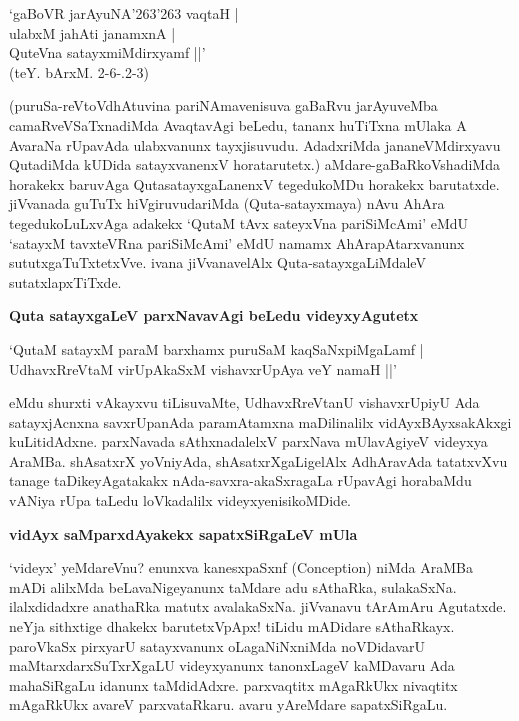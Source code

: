 \begin{shloka}
`gaBoVR jarAyuNA\char'263\char'263 vaqtaH |\\\label{87}
ulabxM ja{hA}ti janamxnA |\\
QuteVna satayxmiMdirxyamf ||'\\
(teY. bArxM. 2-6-.2-3)
\end{shloka}

(puruSa-reVtoVdhAtuvina pariNAmavenisuva gaBaRvu jarAyuveMba camaRveVSaTxnadiMda AvaqtavAgi beLedu, tananx huTiTxna mUlaka A AvaraNa rUpavAda ulabxvanunx tayxjisuvudu. AdadxriMda jananeVMdirxyavu QutadiMda kUDida satayxvanenxV horatarutetx.) aMdare-gaBaRkoVshadiMda horakekx baruvAga QutasatayxgaLanenxV tegedukoMDu horakekx barutatxde. jiVvanada guTuTx hiVgiruvudariMda (Quta-satayxmaya) nAvu AhAra tegedukoLuLxvAga adakekx `QutaM tAvx sateyxVna pariSiMcAmi' eMdU `satayxM tavxteVRna pariSiMcAmi'\label{87} eMdU namamx AhArapAtarxvanunx sututxgaTuTxtetxVve. ivana jiVvanavelAlx Quta-satayxgaLiMdaleV sutatxlapxTiTxde.

\noindent
\textbf{Quta satayxgaLeV parxNavavAgi beLedu videyxyAgutetx}\label{page87}

\begin{shloka}
`QutaM satayxM paraM barxhamx puruSaM kaqSaNxpiMgaLamf |\\\label{87}
UdhavxRreVtaM virUpAkaSxM vishavxrUpAya veY namaH ||'
\end{shloka}

eMdu shurxti vAkayxvu tiLisuvaMte, UdhavxRreVtanU vishavxrUpiyU Ada satayxjAcnxna savxrUpanAda paramAtamxna maDilinalilx vidAyxBAyxsakAkxgi kuLitidAdxne. parxNavada sAthxnadalelxV parxNava mUlavAgiyeV videyxya AraMBa. shAsatxrX yoVniyAda, shAsatxrXgaLigelAlx AdhAravAda tatatxvXvu tanage taDikeyAgatakakx nAda-savxra-akaSxragaLa rUpavAgi horabaMdu vANiya rUpa taLedu loVkadalilx videyxyenisikoMDide.

\noindent
\textbf{vidAyx saMparxdAyakekx sapatxSiRgaLeV mUla}

`videyx' yeMdareVnu? enunxva kanesxpaSxnf ({\rm Conception}) niMda AraMBa mADi alilxMda beLavaNigeyanunx taMdare adu sAthaRka, sulakaSxNa. ilalxdidadxre anathaRka matutx avalakaSxNa. jiVvanavu tArAmAru Agutatxde. neYja sithxtige dhakekx barutetxVpApx! tiLidu mADidare sAthaRkayx. paroVkaSx pirxyarU satayxvanunx oLagaNiNxniMda noVDidavarU maMtarxdarxSuTxrXgaLU videyxyanunx tanonxLageV kaMDavaru Ada mahaSiRgaLu idanunx taMdidAdxre. parxvaqtitx mAgaRkUkx nivaqtitx mAgaRkUkx avareV parxvataRkaru. avaru yAreMdare sapatxSiRgaLu.


